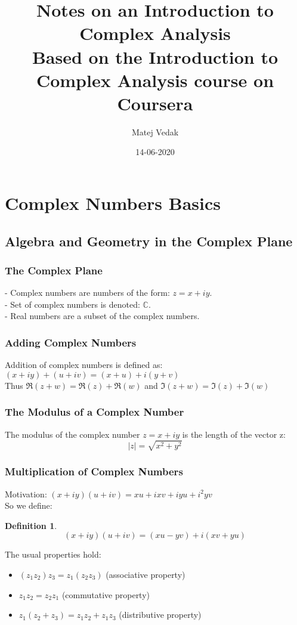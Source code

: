 \documentclass{article}
\title{Notes on an Introduction to Complex Analysis\\
	\normalsize Based on the Introduction to Complex Analysis course on Coursera}
\date{14-06-2020}
\author{Matej Vedak}
\newtheorem{definition}{Definition}[section]
\begin{document}
\maketitle
\newpage
\tableofcontents
\newpage
\section{Complex Numbers Basics}

\subsection{Algebra and Geometry in the Complex Plane}

\subsubsection{The Complex Plane}
- Complex numbers are numbers of the form: $z = x + iy$. \\
- Set of complex numbers is denoted: $\mathbb{C}$. \\
- Real numbers are a subset of the complex numbers.

\subsubsection{Adding Complex Numbers}
Addition of complex numbers is defined as: $(x + iy) + (u+ iv) = (x + u) + i(y + v)$ \\
Thus $\Re(z + w) = \Re(z) + \Re(w)$ and $\Im(z + w) = \Im(z) + \Im(w)$

\subsubsection{The Modulus of a Complex Number}
The modulus of the complex number $z = x + iy$ is the length of the vector z:
\begin{equation*}
\left|z\right| = \sqrt{x^2 + y^2}
\end{equation*}

\subsubsection{Multiplication of Complex Numbers}
Motivation: $(x + iy)(u + iv) = xu + ixv + iyu + i^2yv$ \\
So we define:
\begin{definition}
\begin{equation*}
(x + iy)(u + iv) = (xu - yv) + i(xv + yu)
\end{equation*}
\end{definition}
The usual properties hold:
\begin{itemize}
\item $(z_1z_2)z_3 = z_1(z_2z_3)$ (associative property)
\item $z_1z_2 = z_2z_1$ (commutative property)
\item $z_1(z_2 + z_3) = z_1z_2 + z_1z_3$ (distributive property)
\end{itemize}
\end{document}

